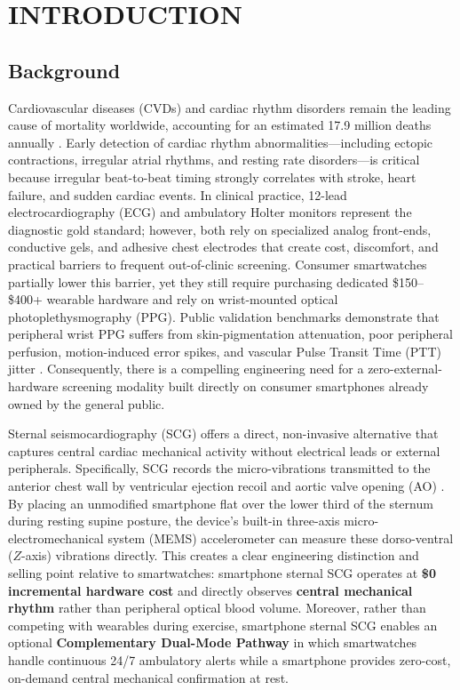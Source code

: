 \chapter{INTRODUCTION}

\section{Background}

Cardiovascular diseases (CVDs) and cardiac rhythm disorders remain the leading cause of mortality worldwide, accounting for an estimated 17.9 million deaths annually \cite{who2025cvd}. Early detection of cardiac rhythm abnormalities---including ectopic contractions, irregular atrial rhythms, and resting rate disorders---is critical because irregular beat-to-beat timing strongly correlates with stroke, heart failure, and sudden cardiac events. In clinical practice, 12-lead electrocardiography (ECG) and ambulatory Holter monitors represent the diagnostic gold standard; however, both rely on specialized analog front-ends, conductive gels, and adhesive chest electrodes that create cost, discomfort, and practical barriers to frequent out-of-clinic screening. Consumer smartwatches partially lower this barrier, yet they still require purchasing dedicated \$150--\$400+ wearable hardware and rely on wrist-mounted optical photoplethysmography (PPG). Public validation benchmarks demonstrate that peripheral wrist PPG suffers from skin-pigmentation attenuation, poor peripheral perfusion, motion-induced error spikes, and vascular Pulse Transit Time (PTT) jitter \cite{bent2020investigating, nelson2019accuracy}. Consequently, there is a compelling engineering need for a zero-external-hardware screening modality built directly on consumer smartphones already owned by the general public.

Sternal seismocardiography (SCG) offers a direct, non-invasive alternative that captures central cardiac mechanical activity without electrical leads or external peripherals. Specifically, SCG records the micro-vibrations transmitted to the anterior chest wall by ventricular ejection recoil and aortic valve opening (AO) \cite{inan2015ballistocardiography, tadi2016realtime}. By placing an unmodified smartphone flat over the lower third of the sternum during resting supine posture, the device's built-in three-axis micro-electromechanical system (MEMS) accelerometer can measure these dorso-ventral ($Z$-axis) vibrations directly. This creates a clear engineering distinction and selling point relative to smartwatches: smartphone sternal SCG operates at \textbf{\$0 incremental hardware cost} and directly observes \textbf{central mechanical rhythm} rather than peripheral optical blood volume. Moreover, rather than competing with wearables during exercise, smartphone sternal SCG enables an optional \textbf{Complementary Dual-Mode Pathway} in which smartwatches handle continuous 24/7 ambulatory alerts \cite{perez2019large, lubitz2022detection} while a smartphone provides zero-cost, on-demand central mechanical confirmation at rest.

